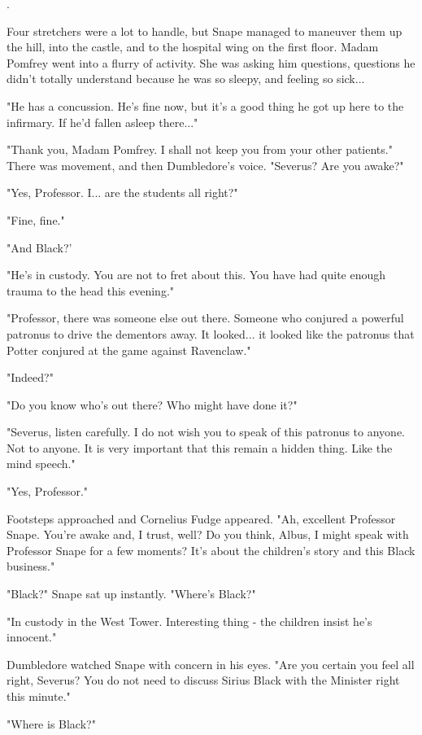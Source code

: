 .

Four stretchers were a lot to handle, but Snape managed to maneuver them up the hill, into the castle, and to the hospital wing on the first floor. Madam Pomfrey went into a flurry of activity. She was asking him questions, questions he didn't totally understand because he was so sleepy, and feeling so sick...

\sbreak

"He has a concussion. He's fine now, but it's a good thing he got up here to the infirmary. If he'd fallen asleep there..."

"Thank you, Madam Pomfrey. I shall not keep you from your other patients." There was movement, and then Dumbledore's voice. "Severus? Are you awake?"

"Yes, Professor. I... are the students all right?"

"Fine, fine."

"And Black?'

"He's in custody. You are not to fret about this. You have had quite enough trauma to the head this evening."

"Professor, there was someone else out there. Someone who conjured a powerful patronus to drive the dementors away. It looked... it looked like the patronus that Potter conjured at the game against Ravenclaw."

"Indeed?"

"Do you know who's out there? Who might have done it?"

"Severus, listen carefully. I do not wish you to speak of this patronus to anyone. Not to anyone. It is very important that this remain a hidden thing. Like the mind speech."

"Yes, Professor."

Footsteps approached and Cornelius Fudge appeared. "Ah, excellent Professor Snape. You're awake and, I trust, well? Do you think, Albus, I might speak with Professor Snape for a few moments? It's about the children's story and this Black business."

"Black?" Snape sat up instantly. "Where's Black?"

"In custody in the West Tower. Interesting thing - the children insist he's innocent."

Dumbledore watched Snape with concern in his eyes. "Are you certain you feel all right, Severus? You do not need to discuss Sirius Black with the Minister right this minute."

"Where is Black?"

